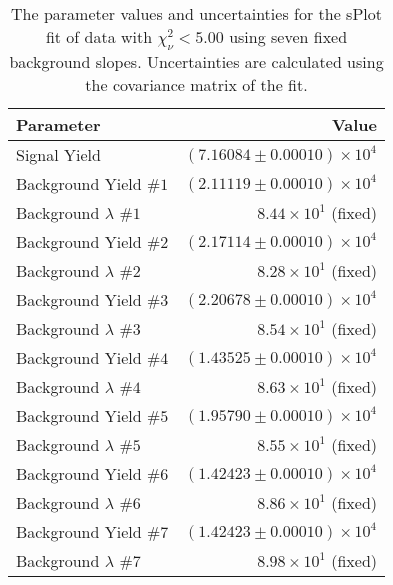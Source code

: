 
\begin{table}[ht]
    \begin{center}
        \begin{tabular}{lr}\toprule
            Parameter & Value \\\midrule
            Signal Yield & $(7.16084 \pm 0.00010) \times 10^{4}$ \\
            Background Yield $\#1$ & $(2.11119 \pm 0.00010) \times 10^{4}$ \\
            Background $\lambda$ $\#1$ & $8.44 \times 10^{1}$ (fixed) \\
            Background Yield $\#2$ & $(2.17114 \pm 0.00010) \times 10^{4}$ \\
            Background $\lambda$ $\#2$ & $8.28 \times 10^{1}$ (fixed) \\
            Background Yield $\#3$ & $(2.20678 \pm 0.00010) \times 10^{4}$ \\
            Background $\lambda$ $\#3$ & $8.54 \times 10^{1}$ (fixed) \\
            Background Yield $\#4$ & $(1.43525 \pm 0.00010) \times 10^{4}$ \\
            Background $\lambda$ $\#4$ & $8.63 \times 10^{1}$ (fixed) \\
            Background Yield $\#5$ & $(1.95790 \pm 0.00010) \times 10^{4}$ \\
            Background $\lambda$ $\#5$ & $8.55 \times 10^{1}$ (fixed) \\
            Background Yield $\#6$ & $(1.42423 \pm 0.00010) \times 10^{4}$ \\
            Background $\lambda$ $\#6$ & $8.86 \times 10^{1}$ (fixed) \\
            Background Yield $\#7$ & $(1.42423 \pm 0.00010) \times 10^{4}$ \\
            Background $\lambda$ $\#7$ & $8.98 \times 10^{1}$ (fixed) \\\bottomrule
        \end{tabular}
        \caption{The parameter values and uncertainties for the sPlot fit of data with $\chi^2_\nu < 5.00$ using seven fixed background slopes. Uncertainties are calculated using the covariance matrix of the fit.}\label{tab:splot-fit-results-chisqdof-5.00-fixed-7}
    \end{center}
\end{table}
